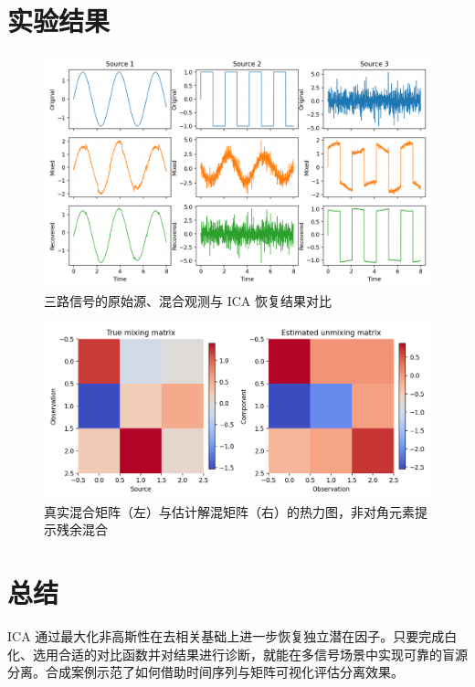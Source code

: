 \documentclass[UTF8,zihao=-4]{ctexart}
\begin{document}
\section{实验结果}
\begin{figure}[H]
  \centering
  \includegraphics[width=0.85\linewidth]{ica_sources_vs_recovered.png}
  \caption{三路信号的原始源、混合观测与 ICA 恢复结果对比}
  \label{fig:ica_sources_vs_recovered_cn}
\end{figure}

\begin{figure}[H]
  \centering
  \includegraphics[width=0.75\linewidth]{ica_mixing_matrices.png}
  \caption{真实混合矩阵（左）与估计解混矩阵（右）的热力图，非对角元素提示残余混合}
  \label{fig:ica_mixing_matrices_cn}
\end{figure}

\FloatBarrier
\section{总结}
ICA 通过最大化非高斯性在去相关基础上进一步恢复独立潜在因子。只要完成白化、选用合适的对比函数并对结果进行诊断，就能在多信号场景中实现可靠的盲源分离。合成案例示范了如何借助时间序列与矩阵可视化评估分离效果。
\end{document}

